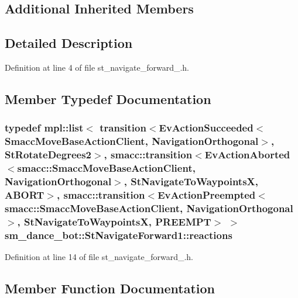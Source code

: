 \subsection*{Additional Inherited Members}


\subsection{Detailed Description}


Definition at line 4 of file st\+\_\+navigate\+\_\+forward\+\_.\+h.



\subsection{Member Typedef Documentation}
\subsubsection[{\texorpdfstring{reactions}{reactions}}]{\setlength{\rightskip}{0pt plus 5cm}typedef mpl\+::list$<$ transition$<$Ev\+Action\+Succeeded$<$Smacc\+Move\+Base\+Action\+Client, {\bf Navigation\+Orthogonal}$>$, {\bf St\+Rotate\+Degrees2}$>$, {\bf smacc\+::transition}$<$Ev\+Action\+Aborted$<${\bf smacc\+::\+Smacc\+Move\+Base\+Action\+Client}, {\bf Navigation\+Orthogonal}$>$, {\bf St\+Navigate\+To\+WaypointsX}, {\bf A\+B\+O\+RT}$>$, {\bf smacc\+::transition}$<$Ev\+Action\+Preempted$<${\bf smacc\+::\+Smacc\+Move\+Base\+Action\+Client}, {\bf Navigation\+Orthogonal}$>$, {\bf St\+Navigate\+To\+WaypointsX}, {\bf P\+R\+E\+E\+M\+PT}$>$ $>$ {\bf sm\+\_\+dance\+\_\+bot\+::\+St\+Navigate\+Forward1\+::reactions}}\hypertarget{structsm__dance__bot_1_1StNavigateForward1_a444670aefb79b460181dd41dba6a4432}{}\label{structsm__dance__bot_1_1StNavigateForward1_a444670aefb79b460181dd41dba6a4432}


Definition at line 14 of file st\+\_\+navigate\+\_\+forward\+\_.\+h.



\subsection{Member Function Documentation}
